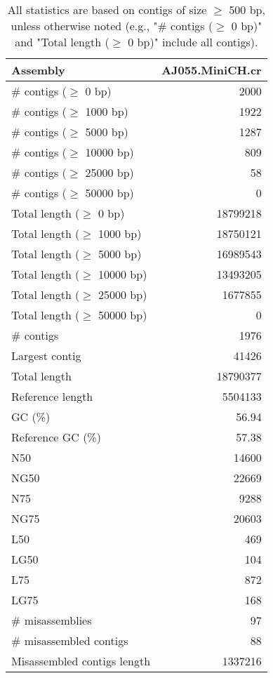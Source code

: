 \documentclass[12pt,a4paper]{article}
\begin{document}
\begin{table}[ht]
\begin{center}
\caption{All statistics are based on contigs of size $\geq$ 500 bp, unless otherwise noted (e.g., "\# contigs ($\geq$ 0 bp)" and "Total length ($\geq$ 0 bp)" include all contigs).}
\begin{tabular}{|l*{1}{|r}|}
\hline
Assembly & AJ055.MiniCH.cr \\ \hline
\# contigs ($\geq$ 0 bp) & 2000 \\ \hline
\# contigs ($\geq$ 1000 bp) & 1922 \\ \hline
\# contigs ($\geq$ 5000 bp) & 1287 \\ \hline
\# contigs ($\geq$ 10000 bp) & 809 \\ \hline
\# contigs ($\geq$ 25000 bp) & 58 \\ \hline
\# contigs ($\geq$ 50000 bp) & 0 \\ \hline
Total length ($\geq$ 0 bp) & 18799218 \\ \hline
Total length ($\geq$ 1000 bp) & 18750121 \\ \hline
Total length ($\geq$ 5000 bp) & 16989543 \\ \hline
Total length ($\geq$ 10000 bp) & 13493205 \\ \hline
Total length ($\geq$ 25000 bp) & 1677855 \\ \hline
Total length ($\geq$ 50000 bp) & 0 \\ \hline
\# contigs & 1976 \\ \hline
Largest contig & 41426 \\ \hline
Total length & 18790377 \\ \hline
Reference length & 5504133 \\ \hline
GC (\%) & 56.94 \\ \hline
Reference GC (\%) & 57.38 \\ \hline
N50 & 14600 \\ \hline
NG50 & 22669 \\ \hline
N75 & 9288 \\ \hline
NG75 & 20603 \\ \hline
L50 & 469 \\ \hline
LG50 & 104 \\ \hline
L75 & 872 \\ \hline
LG75 & 168 \\ \hline
\# misassemblies & 97 \\ \hline
\# misassembled contigs & 88 \\ \hline
Misassembled contigs length & 1337216 \\ \hline

\end{tabular}
\end{center}
\end{table}
\end{document}
